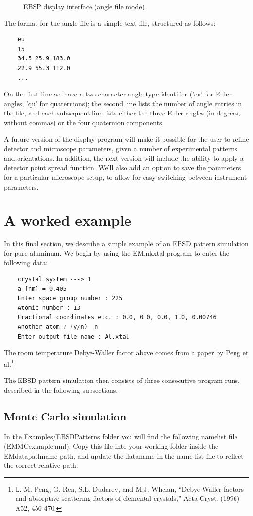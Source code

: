 \documentclass[DIV=calc, paper=letter, fontsize=11pt]{scrartcl}	 %
\begin{document}
\begin{figure}[t]
\leavevmode\centering
\epsfxsize=3in
\caption{\label{fig:EBSP2}EBSP display interface (angle file mode).}
\end{figure}

The format for the angle file is a simple text file, structured as follows:
\begin{verbatim}
	eu
	15
	34.5 25.9 183.0
	22.9 65.3 112.0
	...
\end{verbatim}
On the first line we have a two-character angle type identifier ('eu' for Euler angles, 'qu' for quaternions); the second line 
lists the number of angle entries in the file, and each subsequent line lists either the three Euler angles (in degrees, without commas)
or the four quaternion components.

A future version of the display program will make it possible for the user to refine detector and microscope parameters, given a number of experimental
patterns and orientations.  In addition, the next version will include the ability to apply a detector point spread function.  We'll also add
an option to save the parameters for a particular microscope setup, to allow for easy switching between instrument parameters.


\newpage
\section{A worked example\label{sec:examples}}
In this final section, we describe a simple example of an EBSD pattern simulation for pure aluminum.  We begin by using the 
\textsf{EMmkxtal} program to enter the following data:
\begin{verbatim}
	crystal system ---> 1
	a [nm] = 0.405
	Enter space group number : 225
	Atomic number : 13
	Fractional coordinates etc. : 0.0, 0.0, 0.0, 1.0, 0.00746
	Another atom ? (y/n)  n
	Enter output file name : Al.xtal
\end{verbatim}
The room temperature Debye-Waller factor above comes from a paper by Peng et al.\footnote{L.-M. Peng, G. Ren, S.L. Dudarev, and M.J. Whelan,
``Debye-Waller factors and absorptive scattering factors of elemental crystals,'' Acta Cryst. (1996) A52, 456-470.}

The EBSD pattern simulation then consists of three consecutive program runs, described in the following subsections.

\subsection{Monte Carlo simulation}
In the \textsf{Examples/EBSDPatterns} folder you will find the following namelist file (EMMCexample.nml):
Copy this file into your working folder inside the \textsf{EMdatapathname} path, and update the \textsf{dataname}
in the name list file to reflect the correct relative path.
 
\end{document}
